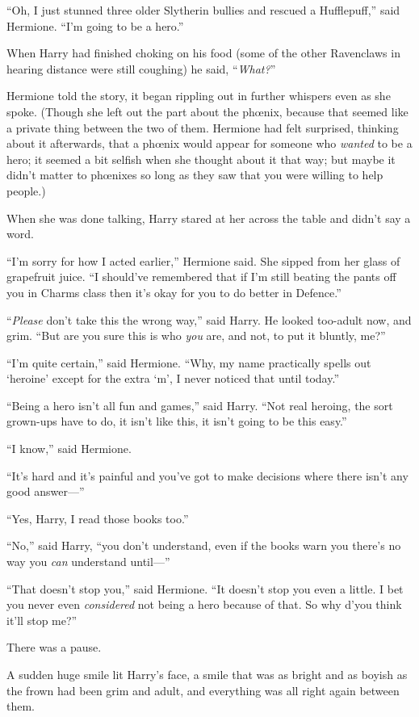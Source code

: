 “Oh, I just stunned three older Slytherin bullies and rescued a Hufflepuff,” said Hermione.
“I’m going to be a hero.”

When Harry had finished choking on his food (some of the other Ravenclaws in hearing distance were still coughing) he said, “\emph{What?}”

Hermione told the story, it began rippling out in further whispers even as she spoke. (Though she left out the part about the phœnix, because that seemed like a private thing between the two of them. Hermione had felt surprised, thinking about it afterwards, that a phœnix would appear for someone who \emph{wanted} to be a hero; it seemed a bit selfish when she thought about it that way; but maybe it didn’t matter to phœnixes so long as they saw that you were willing to help people.)

When she was done talking, Harry stared at her across the table and didn’t say a word.

“I’m sorry for how I acted earlier,” Hermione said. She sipped from her glass of grapefruit juice.
“I should’ve remembered that if I’m still beating the pants off you in Charms class then it’s okay for you to do better in Defence.”

“\emph{Please} don’t take this the wrong way,” said Harry. He looked too-adult now, and grim.
“But are you sure this is who \emph{you} are, and not, to put it bluntly, me?”

“I’m quite certain,” said Hermione.
“Why, my name practically spells out ‘heroine’ except for the extra ‘m’, I never noticed that until today.”

“Being a hero isn’t all fun and games,” said Harry.
“Not real heroing, the sort grown-ups have to do, it isn’t like this, it isn’t going to be this easy.”

“I know,” said Hermione.

“It’s hard and it’s painful and you’ve got to make decisions where there isn’t any good answer—”

“Yes, Harry, I read those books too.”

“No,” said Harry, “you don’t understand, even if the books warn you there’s no way you \emph{can} understand until—”

“That doesn’t stop you,” said Hermione.
“It doesn’t stop you even a little. I bet you never even \emph{considered} not being a hero because of that. So why d’you think it’ll stop me?”

There was a pause.

A sudden huge smile lit Harry’s face, a smile that was as bright and as boyish as the frown had been grim and adult, and everything was all right again between them.

